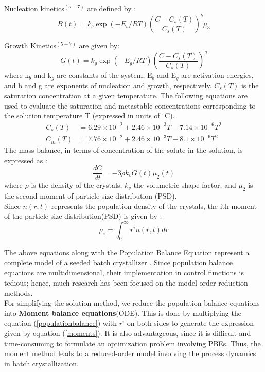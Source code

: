Nucleation kinetics$^{(5-7)}$ are defined by :
\begin{equation}
B(t) = k_{b}\exp{\left(-E_{b}/RT \right)}\left(\frac{C - C_{s}(T)}{C_{s}(T)}\right)^{b}\mu_{3}
\end{equation}  


Growth Kinetics$^{(5-7)}$ are given by:
\begin{equation}
G(t) = k_{g}\exp{\left(-E_{g}/RT \right)}\left(\frac{C - C_{s}(T)}{C_{s}(T)}\right)^{g}
\end{equation}
where k$_{b}$ and k$_{g}$ are constants of the system, E$_{b}$ and E$_{g}$ are activation energies, and b and g are exponents of nucleation and growth, respectively. $C_{s}(T)$ is the saturation concentration at a given temperature. The following equations are used to evaluate the saturation and metastable concentrations corresponding to the solution temperature T (expressed in units of $^\circ$C)\cite{shi}.
\begin{align}
C_{s}(T) &= 6.29\times10^{-2} + 2.46\times10^{-3}T - 7.14\times10^{-6}T^{2} \\
C_{m}(T) &= 7.76\times10^{-2} + 2.46\times10^{-3}T - 8.1\times10^{-6}T^{2}
\end{align} 
The mass balance, in terms of concentration of the solute in the solution, is expressed as :
\begin{equation}
\frac{dC}{dt} = -3\rho{}k_{v}G(t)\mu_{2}(t)
\end{equation}
where $\rho{}$ is the density of the crystals, $k_{v}$ the volumetric shape factor, and $\mu_{2}$ is the second moment of particle size distribution (PSD).\\

Since $n(r,t)$ represents the population density of the crystals\cite{randolph}, the ith moment of the particle size distribution(PSD) is given by :
\begin{equation} \label{moments}
\mu_{i} = \int_{0}^{\infty} r^{i}n(r,t) dr
\end{equation}

The above equations along with the Population Balance Equation represent a complete model of a seeded batch crystallizer . 
Since population balance equations are multidimensional, their implementation in control functions is tedious; hence, much research has been focused on the model order reduction methods.\\
For simplifying the solution method, we reduce the population balance equations into \textbf{Moment balance equations}(ODE). This is done by multiplying the equation (\ref{populationbalance})  with $r^{i}$ on both sides to generate the expression given by equation (\ref{moments}). It is also advantageous, since it is difficult and time-consuming to formulate an optimization problem involving PBEs. Thus, the moment method leads to a reduced-order model involving the process dynamics in batch crystallization.

